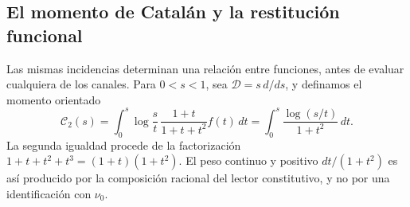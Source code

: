 \subsection{El momento de Catalán y la restitución funcional}
\label{hmtfg:articulacion:catalan}

Las mismas incidencias determinan una relación entre funciones,
antes de evaluar cualquiera de los canales. Para \(0<s<1\), sea
\(\mathcal D=s\,d/ds\), y definamos el momento orientado
\begin{equation}
 \mathcal C_2(s)
 =\int_0^s\log\frac{s}{t}\,
     \frac{1+t}{1+t+t^2}f(t)\,dt
 =\int_0^s\frac{\log(s/t)}{1+t^2}\,dt.
 \label{hmtfg:articulacion:integral}
\end{equation}
La segunda igualdad procede de la factorización
\(1+t+t^2+t^3=(1+t)(1+t^2)\). El peso continuo y positivo
\(dt/(1+t^2)\) es así producido por la composición racional
del lector constitutivo, y no por una identificación con
\(\nu_0\).

